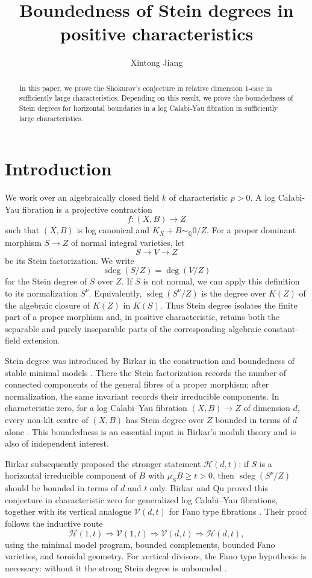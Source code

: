 \documentclass[letterpaper,reqno,12pt]{amsart}
\title{Boundedness of Stein degrees in positive characteristics}
\author{Xintong Jiang}
\date{}
\DeclareMathOperator{\sdeg}{sdeg}
\numberwithin{equation}{section}
\theoremstyle{plain}
\begin{document}
\begin{abstract}
In this paper, we prove the Shokurov's conjecture in relative dimension $1$-case in sufficiently large characteristics. Depending on this result, we prove the boundedness of Stein degrees for horizontal boundaries in a log Calabi-Yau fibration in sufficiently large characteristics.
\end{abstract}
\maketitle
\tableofcontents
\section{Introduction}
We work over an algebraically closed field $k$ of characteristic $p>0$.  A log Calabi-Yau fibration is a projective contraction
\[
 f:(X,B)\longrightarrow Z
\]
such that $(X,B)$ is log canonical and $K_X+B\sim_\mathbb Q0/Z$.  For a proper dominant morphism $S\to Z$ of normal integral varieties, let
\[
 S\longrightarrow V\longrightarrow Z
\]
be its Stein factorization.  We write
\[
 \sdeg(S/Z)=\deg(V/Z)
\]
for the Stein degree of $S$ over $Z$.  If $S$ is not normal, we can apply this definition to its normalization $S^\nu$.  Equivalently, $\sdeg(S^\nu/Z)$ is the degree over $K(Z)$ of the algebraic closure of $K(Z)$ in $K(S)$.  Thus Stein degree isolates the finite part of a proper morphism and, in positive characteristic, retains both the separable and purely inseparable parts of the corresponding algebraic constant-field extension.

Stein degree was introduced by Birkar in the construction and boundedness of stable minimal models \cite{BirkarFano}.  There the Stein factorization records the number of connected components of the general fibres of a proper morphism; after normalization, the same invariant records their irreducible components.  In characteristic zero, for a log Calabi--Yau fibration $(X,B)\to Z$ of dimension $d$, every non-klt centre of $(X,B)$ has Stein degree over $Z$ bounded in terms of $d$ alone \cite{BirkarFano}.  This boundedness is an essential input in Birkar's moduli theory and is also of independent interest.

Birkar subsequently proposed the stronger statement $\mathcal H(d,t)$: if $S$ is a horizontal irreducible component of $B$ with $\mu_S B\ge t>0$, then $\sdeg(S^\nu/Z)$ should be bounded in terms of $d$ and $t$ only.  Birkar and Qu proved this conjecture in characteristic zero for generalized log Calabi--Yau fibrations, together with its vertical analogue $\mathcal V(d,t)$ for Fano type fibrations \cite{BirkarQu}.  Their proof follows the inductive route
\[
 \mathcal H(1,t)\Longrightarrow\mathcal V(1,t)
 \Longrightarrow\mathcal V(d,t)\Longrightarrow\mathcal H(d,t),
\]
using the minimal model program, bounded complements, bounded Fano varieties, and toroidal geometry.  For vertical divisors, the Fano type hypothesis is necessary: without it the strong Stein degree is unbounded \cite{BirkarQuNonFano}.
\end{document}

